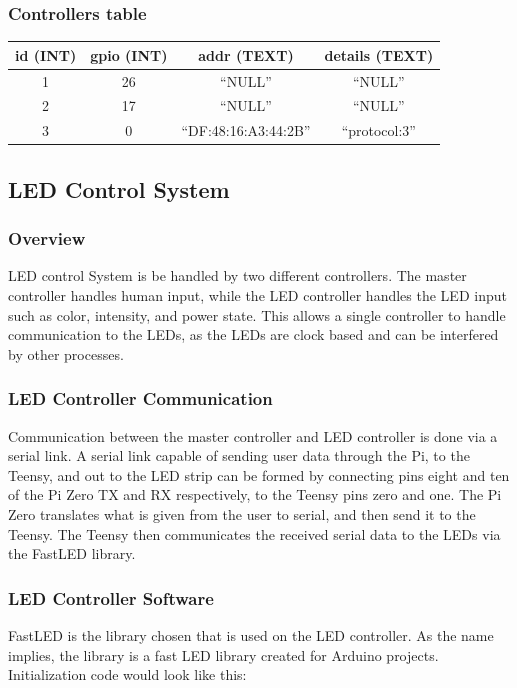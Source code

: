\documentclass[onecolumn, draftclsnofoot,10pt, compsoc]{IEEEtran}
\begin{document}
			\subsubsection{Controllers table}
				\begin{tabular}{ |c|c|c|c| }
					\hline
					id (INT) & gpio (INT) & addr (TEXT) & details (TEXT) \\
					\hline
					1 & 26 & ``NULL'' & ``NULL'' \\
					2 & 17 & ``NULL'' & ``NULL'' \\
					3 & 0 & ``DF:48:16:A3:44:2B'' & ``protocol:3'' \\
					\hline
				\end{tabular}


		\subsection{LED Control System}
			\subsubsection{Overview}
				\noindent LED control System is be handled by two different controllers. The master controller handles human input, while the LED controller handles the LED input such as color, intensity, and power state.
				This allows a single controller to handle communication to the LEDs, as the
				LEDs are clock based and can be interfered by other processes. \cite{fastLED}
				\subsubsection{LED Controller Communication}
				\noindent Communication between the master controller and LED controller is done via a serial link.
				A serial link capable of sending user data through the Pi, to the Teensy, and out to the LED strip can be formed by connecting pins eight and ten of the Pi Zero TX and RX respectively, to the Teensy pins zero and one.
				The Pi Zero translates what is given from the user to serial, and then send it to the Teensy. The Teensy then communicates the received serial data to the LEDs via the FastLED library.
				\subsubsection{LED Controller Software}
				\noindent FastLED is the library chosen that is used on the LED controller.
				As the name implies, the library is a fast LED library created for Arduino projects.
				Initialization code would look like this:
\end{document}
